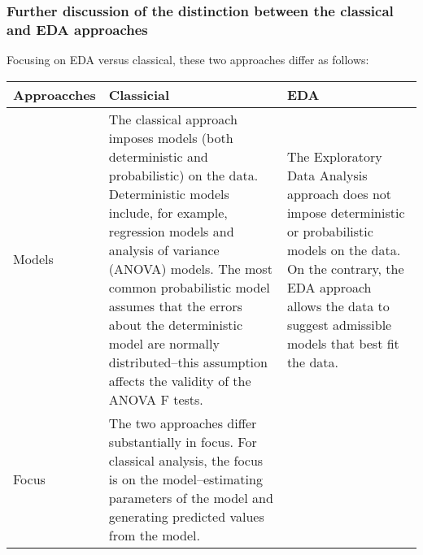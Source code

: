 \documentclass[]{book}
\theoremstyle{definition}
\theoremstyle{definition}
\theoremstyle{definition}
\theoremstyle{remark}
\begin{document}
\subsubsection{Further discussion of the distinction between the
classical and EDA
approaches}\label{further-discussion-of-the-distinction-between-the-classical-and-eda-approaches}

Focusing on EDA versus classical, these two approaches differ as
follows:

\begin{longtable}[]{@{}lll@{}}
\toprule
\begin{minipage}[b]{0.14\columnwidth}\raggedright\strut
Approacches\strut
\end{minipage} & \begin{minipage}[b]{0.39\columnwidth}\raggedright\strut
Classicial\strut
\end{minipage} & \begin{minipage}[b]{0.39\columnwidth}\raggedright\strut
EDA\strut
\end{minipage}\tabularnewline
\midrule
\endhead
\begin{minipage}[t]{0.14\columnwidth}\raggedright\strut
Models\strut
\end{minipage} & \begin{minipage}[t]{0.39\columnwidth}\raggedright\strut
The classical approach imposes models (both deterministic and
probabilistic) on the data. Deterministic models include, for example,
regression models and analysis of variance (ANOVA) models. The most
common probabilistic model assumes that the errors about the
deterministic model are normally distributed--this assumption affects
the validity of the ANOVA F tests.\strut
\end{minipage} & \begin{minipage}[t]{0.39\columnwidth}\raggedright\strut
The Exploratory Data Analysis approach does not impose deterministic or
probabilistic models on the data. On the contrary, the EDA approach
allows the data to suggest admissible models that best fit the
data.\strut
\end{minipage}\tabularnewline
\begin{minipage}[t]{0.14\columnwidth}\raggedright\strut
Focus\strut
\end{minipage} & \begin{minipage}[t]{0.39\columnwidth}\raggedright\strut
The two approaches differ substantially in focus. For classical
analysis, the focus is on the model--estimating parameters of the model
and generating predicted values from the model.\strut

\end{minipage}
\end{longtable}
\end{document}
